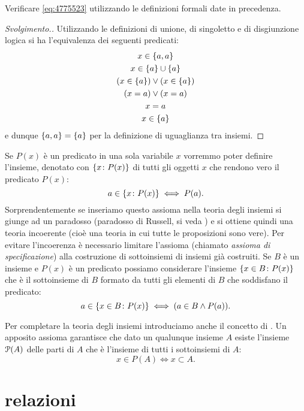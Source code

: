 \begin{exercise}
  Verificare \eqref{eq:4775523} utilizzando le definizioni formali date in precedenza.
\end{exercise}
\begin{proof}[Svolgimento.]
Utilizzando le definizioni di unione, di singoletto e di disgiunzione logica
si ha l'equivalenza dei seguenti
predicati:
\begin{gather*}
  x \in \ENCLOSE{a,a}  \\
  x \in \ENCLOSE{a} \cup \ENCLOSE{a}\\
  (x \in \ENCLOSE{a}) \lor (x \in \ENCLOSE{a})\\
  (x = a) \lor (x = a) \\
  x = a \\
  x \in \ENCLOSE{a}
\end{gather*}
e dunque $\ENCLOSE{a,a}=\ENCLOSE{a}$ per la definizione di uguaglianza tra insiemi.
\end{proof}

Se $P(x)$ è un predicato in una sola variabile $x$ vorremmo poter
definire l'insieme, denotato con $\ENCLOSE{x\colon P(x)}$
di tutti gli oggetti $x$ che rendono vero il predicato $P(x)$:
\[
  a \in \ENCLOSE{x\colon P(x)} \iff P(a).
\]
Sorprendentemente se inseriamo questo assioma nella teoria degli insiemi
si giunge ad un paradosso (paradosso di Russell, si veda \cite{appunti_logica})
e si ottiene quindi una teoria incoerente
(cioè una teoria in cui tutte le proposizioni sono vere). Per evitare
l'incoerenza è necessario limitare l'assioma (chiamato \emph{assioma di specificazione})
alla costruzione di sottoinsiemi di insiemi già costruiti.
Se $B$ è un insieme e $P(x)$ è un predicato possiamo considerare
l'insieme $\ENCLOSE{x\in B\colon P(x)}$ che è il sottoinsieme di
$B$ formato da tutti gli elementi di $B$
che soddisfano il predicato:
\[
  a \in \ENCLOSE{x\in B\colon P(x)} \iff (a \in B \land P(a)).
\]

Per completare la teoria degli insiemi introduciamo anche il concetto di
.
% 
\label{def:insieme_parti}%
Un apposito assioma garantisce
che dato un qualunque insieme $A$ esiste l'insieme $\P(A)$ delle parti di $A$
che è l'insieme di tutti i sottoinsiemi di $A$:
\begin{equation}\label{eq:insieme_delle_parti}
  x \in P(A) \iff x \subset A.
\end{equation}

\section{relazioni}

